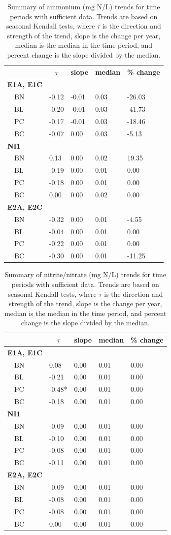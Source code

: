 \documentclass[letterpaper,12pt]{article}\usepackage[]{graphicx}\usepackage[]{color}
\begin{document}
\begin{table}[!tbp]
\caption{Summary of ammonium (mg N/L) trends for time periods with sufficient data.  Trends are based on seasonal Kendall tests, where $\tau$ is the direction and strength of the trend, slope is the change per year, median is the median in the time period, and percent change is the slope divided by the median.\label{tab:NH4Ftrnd}} 
\begin{center}
\begin{tabular}{lllll}
\hline\hline
\multicolumn{1}{l}{}&\multicolumn{1}{c}{$\tau$}&\multicolumn{1}{c}{slope}&\multicolumn{1}{c}{median}&\multicolumn{1}{c}{\% change}\tabularnewline
\hline
{\bfseries E1A, E1C}&&&&\tabularnewline
~~BN&-0.12&-0.01&0.03&-26.03\tabularnewline
~~BL&-0.20&-0.01&0.03&-41.73\tabularnewline
~~PC&-0.17&-0.01&0.03&-18.46\tabularnewline
~~BC&-0.07&0.00&0.03&-5.13\tabularnewline
\hline
{\bfseries NI1}&&&&\tabularnewline
~~BN&0.13&0.00&0.02&19.35\tabularnewline
~~BL&-0.19&0.00&0.01&0.00\tabularnewline
~~PC&-0.18&0.00&0.01&0.00\tabularnewline
~~BC&0.00&0.00&0.02&0.00\tabularnewline
\hline
{\bfseries E2A, E2C}&&&&\tabularnewline
~~BN&-0.32&0.00&0.01&-4.55\tabularnewline
~~BL&-0.04&0.00&0.01&0.00\tabularnewline
~~PC&-0.22&0.00&0.01&0.00\tabularnewline
~~BC&-0.30&0.00&0.01&-11.25\tabularnewline
\hline
\end{tabular}\end{center}
\end{table}
\begin{table}[!tbp]
\caption{Summary of nitrite/nitrate (mg N/L) trends for time periods with sufficient data.  Trends are based on seasonal Kendall tests, where $\tau$ is the direction and strength of the trend, slope is the change per year, median is the median in the time period, and percent change is the slope divided by the median.\label{tab:NO23Ftrnd}} 
\begin{center}
\begin{tabular}{lllll}
\hline\hline
\multicolumn{1}{l}{}&\multicolumn{1}{c}{$\tau$}&\multicolumn{1}{c}{slope}&\multicolumn{1}{c}{median}&\multicolumn{1}{c}{\% change}\tabularnewline
\hline
{\bfseries E1A, E1C}&&&&\tabularnewline
~~BN&0.08&0.00&0.01&0.00\tabularnewline
~~BL&-0.21&0.00&0.01&0.00\tabularnewline
~~PC&-0.48*&0.00&0.01&0.00\tabularnewline
~~BC&-0.18&0.00&0.01&0.00\tabularnewline
\hline
{\bfseries NI1}&&&&\tabularnewline
~~BN&-0.09&0.00&0.01&0.00\tabularnewline
~~BL&-0.10&0.00&0.01&0.00\tabularnewline
~~PC&-0.08&0.00&0.01&0.00\tabularnewline
~~BC&-0.11&0.00&0.01&0.00\tabularnewline
\hline
{\bfseries E2A, E2C}&&&&\tabularnewline
~~BN&-0.09&0.00&0.01&0.00\tabularnewline
~~BL&-0.08&0.00&0.01&0.00\tabularnewline
~~PC&-0.08&0.00&0.01&0.00\tabularnewline
~~BC&0.00&0.00&0.01&0.00\tabularnewline
\hline
\end{tabular}\end{center}
\end{table}
\end{document}
